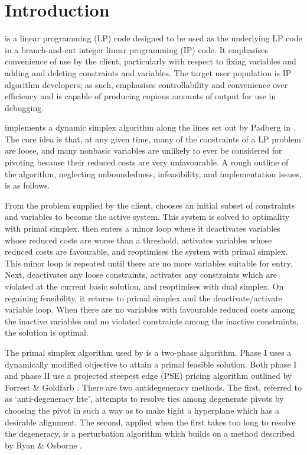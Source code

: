 \section{Introduction}
\label{sec:Intro}

\dylp is a linear programming (LP) code designed to be used as the
underlying LP code in a branch-and-cut integer linear programming (IP) code.
It emphasises convenience of use by the client, particularly with
respect to fixing variables and adding and deleting constraints and
variables.
The target user population is IP algorithm developers; as such, \dylp
emphasises controllability and convenience over efficiency and is capable of
producing copious amounts of output for use in debugging.

\dylp implements a dynamic simplex algorithm
along the lines set out by Padberg in \cite[\S6.6]{Pad95}.
The core idea is that, at any given time, many of the constraints of a LP
problem are loose, and many nonbasic variables are unlikely to ever be
considered for pivoting because their reduced costs are very unfavourable.
A rough outline of the algorithm, neglecting unboundedness,
infeasibility, and implementation issues, is as follows.

From the problem supplied by the client, \dylp chooses an initial subset of
constraints and variables to become the active system.
This system is solved to optimality with primal simplex.
\dylp then enters a minor loop where it deactivates variables whose
reduced costs are worse than a threshold, 
activates variables whose reduced costs are favourable,
and reoptimises the system with primal simplex.
This minor loop is repeated until there are no more variables suitable for
entry.
Next, \dylp deactivates any loose constraints, activates
any constraints which are violated at the current basic solution,
and reoptimises with dual simplex.
On regaining feasibility, it returns to primal simplex and the
deactivate/activate variable loop.
When there are no variables with favourable reduced costs
among the inactive variables and no violated constraints
among the inactive constraints, the solution is optimal.

The primal simplex algorithm used by \dylp is a two-phase algorithm.
Phase I uses a dynamically modified objective to attain a primal feasible
solution.
Both phase I and phase II use a projected steepest edge (PSE) pricing
algorithm outlined by Forrest \& Goldfarb \cite[algorithm `dynamic']{For92}.
There are two antidegeneracy methods.
The first, referred to as `anti-degeneracy lite', attempts to resolve ties
among degenerate pivots by choosing the pivot in such a way as to make tight
a hyperplane which has a desirable alignment.
The second, applied when the first takes too long to resolve the degeneracy,
is a perturbation algorithm which
builds on a method described by Ryan \& Osborne \cite{Rya88}.

